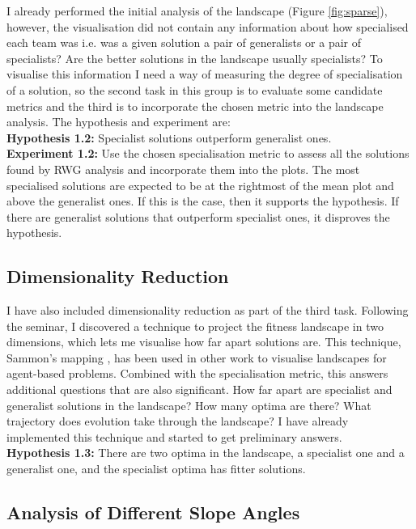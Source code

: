 \documentclass[12pt]{article}
\begin{document}
I already performed the initial analysis of the landscape (Figure \ref{fig:sparse}), however, the visualisation did not contain any information about how specialised each team was i.e. was a given solution a pair of generalists or a pair of specialists? 
Are the better solutions in the landscape usually specialists? 
To visualise this information I need a way of measuring the degree of specialisation of a solution, so the second task in this group is to evaluate some candidate metrics and the third is to incorporate the chosen metric into the landscape analysis.
The hypothesis and experiment are:\\

\textbf{Hypothesis 1.2:} Specialist solutions outperform generalist ones.\\

\textbf{Experiment 1.2:} Use the chosen specialisation metric to assess all the solutions found by RWG analysis and incorporate them into the plots.
The most specialised solutions are expected to be at the rightmost of the mean plot and above the generalist ones.
If this is the case, then it supports the hypothesis.
If there are generalist solutions that outperform specialist ones, it disproves the hypothesis.

\subsection{Dimensionality Reduction}

I have also included dimensionality reduction as part of the third task.
Following the seminar, I discovered a technique to project the fitness landscape in two dimensions, which lets me visualise how far apart solutions are.
This technique, Sammon's mapping \cite{sammon:IEEETR:1969}, has been used in other work \cite{kim:GECCO:2003, risi:AB:2010} to visualise landscapes for agent-based problems.
Combined with the specialisation metric, this answers additional questions that are also significant.
How far apart are specialist and generalist solutions in the landscape?
How many optima are there?
What trajectory does evolution take through the landscape?
I have already implemented this technique and started to get preliminary answers.\\

\textbf{Hypothesis 1.3:} There are two optima in the landscape, a specialist one and a generalist one, and the specialist optima has fitter solutions. \\

\subsection{Analysis of Different Slope Angles}
\end{document}
